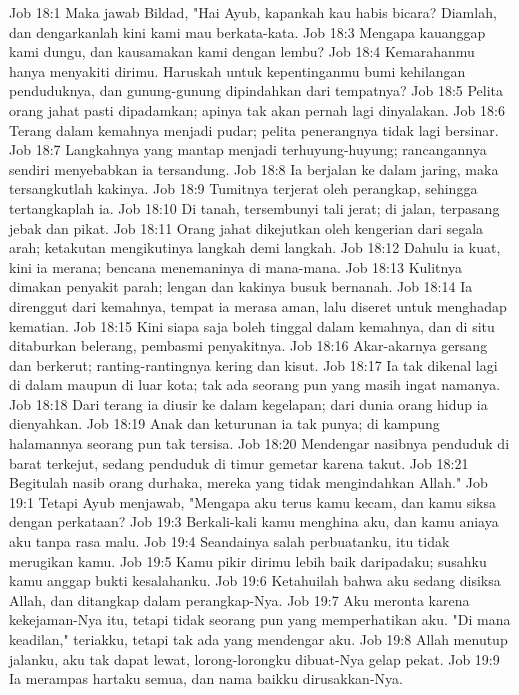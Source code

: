 Job 18:1  Maka jawab Bildad, "Hai Ayub, kapankah kau habis bicara? Diamlah, dan dengarkanlah kini kami mau berkata-kata.
Job 18:3  Mengapa kauanggap kami dungu, dan kausamakan kami dengan lembu?
Job 18:4  Kemarahanmu hanya menyakiti dirimu. Haruskah untuk kepentinganmu bumi kehilangan penduduknya, dan gunung-gunung dipindahkan dari tempatnya?
Job 18:5  Pelita orang jahat pasti dipadamkan; apinya tak akan pernah lagi dinyalakan.
Job 18:6  Terang dalam kemahnya menjadi pudar; pelita penerangnya tidak lagi bersinar.
Job 18:7  Langkahnya yang mantap menjadi terhuyung-huyung; rancangannya sendiri menyebabkan ia tersandung.
Job 18:8  Ia berjalan ke dalam jaring, maka tersangkutlah kakinya.
Job 18:9  Tumitnya terjerat oleh perangkap, sehingga tertangkaplah ia.
Job 18:10  Di tanah, tersembunyi tali jerat; di jalan, terpasang jebak dan pikat.
Job 18:11  Orang jahat dikejutkan oleh kengerian dari segala arah; ketakutan mengikutinya langkah demi langkah.
Job 18:12  Dahulu ia kuat, kini ia merana; bencana menemaninya di mana-mana.
Job 18:13  Kulitnya dimakan penyakit parah; lengan dan kakinya busuk bernanah.
Job 18:14  Ia direnggut dari kemahnya, tempat ia merasa aman, lalu diseret untuk menghadap kematian.
Job 18:15  Kini siapa saja boleh tinggal dalam kemahnya, dan di situ ditaburkan belerang, pembasmi penyakitnya.
Job 18:16  Akar-akarnya gersang dan berkerut; ranting-rantingnya kering dan kisut.
Job 18:17  Ia tak dikenal lagi di dalam maupun di luar kota; tak ada seorang pun yang masih ingat namanya.
Job 18:18  Dari terang ia diusir ke dalam kegelapan; dari dunia orang hidup ia dienyahkan.
Job 18:19  Anak dan keturunan ia tak punya; di kampung halamannya seorang pun tak tersisa.
Job 18:20  Mendengar nasibnya penduduk di barat terkejut, sedang penduduk di timur gemetar karena takut.
Job 18:21  Begitulah nasib orang durhaka, mereka yang tidak mengindahkan Allah."
Job 19:1  Tetapi Ayub menjawab, "Mengapa aku terus kamu kecam, dan kamu siksa dengan perkataan?
Job 19:3  Berkali-kali kamu menghina aku, dan kamu aniaya aku tanpa rasa malu.
Job 19:4  Seandainya salah perbuatanku, itu tidak merugikan kamu.
Job 19:5  Kamu pikir dirimu lebih baik daripadaku; susahku kamu anggap bukti kesalahanku.
Job 19:6  Ketahuilah bahwa aku sedang disiksa Allah, dan ditangkap dalam perangkap-Nya.
Job 19:7  Aku meronta karena kekejaman-Nya itu, tetapi tidak seorang pun yang memperhatikan aku. "Di mana keadilan," teriakku, tetapi tak ada yang mendengar aku.
Job 19:8  Allah menutup jalanku, aku tak dapat lewat, lorong-lorongku dibuat-Nya gelap pekat.
Job 19:9  Ia merampas hartaku semua, dan nama baikku dirusakkan-Nya.
